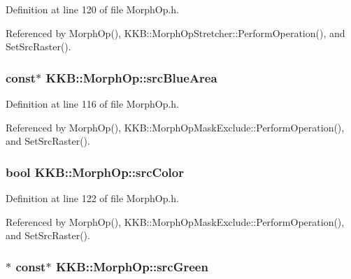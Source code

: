 Definition at line 120 of file Morph\+Op.\+h.



Referenced by Morph\+Op(), K\+K\+B\+::\+Morph\+Op\+Stretcher\+::\+Perform\+Operation(), and Set\+Src\+Raster().

\subsubsection[{\texorpdfstring{src\+Blue\+Area}{srcBlueArea}}]{ const$\ast$ K\+K\+B\+::\+Morph\+Op\+::src\+Blue\+Area\hspace{0.3cm}{\ttfamily [protected]}}\hypertarget{class_k_k_b_1_1_morph_op_a52fcf660b2173a2b6e8988ed23cf638c}{}\label{class_k_k_b_1_1_morph_op_a52fcf660b2173a2b6e8988ed23cf638c}


Definition at line 116 of file Morph\+Op.\+h.



Referenced by Morph\+Op(), K\+K\+B\+::\+Morph\+Op\+Mask\+Exclude\+::\+Perform\+Operation(), and Set\+Src\+Raster().

\subsubsection[{\texorpdfstring{src\+Color}{srcColor}}]{\setlength{\rightskip}{0pt plus 5cm}bool K\+K\+B\+::\+Morph\+Op\+::src\+Color\hspace{0.3cm}{\ttfamily [protected]}}\hypertarget{class_k_k_b_1_1_morph_op_a0cecdeb8369c7ab2689fbd9f997472b0}{}\label{class_k_k_b_1_1_morph_op_a0cecdeb8369c7ab2689fbd9f997472b0}


Definition at line 122 of file Morph\+Op.\+h.



Referenced by Morph\+Op(), K\+K\+B\+::\+Morph\+Op\+Mask\+Exclude\+::\+Perform\+Operation(), and Set\+Src\+Raster().

\subsubsection[{\texorpdfstring{src\+Green}{srcGreen}}]{$\ast$ const$\ast$ K\+K\+B\+::\+Morph\+Op\+::src\+Green\hspace{0.3cm}{\ttfamily [protected]}}\hypertarget{class_k_k_b_1_1_morph_op_ab811c702f7e0c8ffccdd21111c8144ab}{}\label{class_k_k_b_1_1_morph_op_ab811c702f7e0c8ffccdd21111c8144ab}


